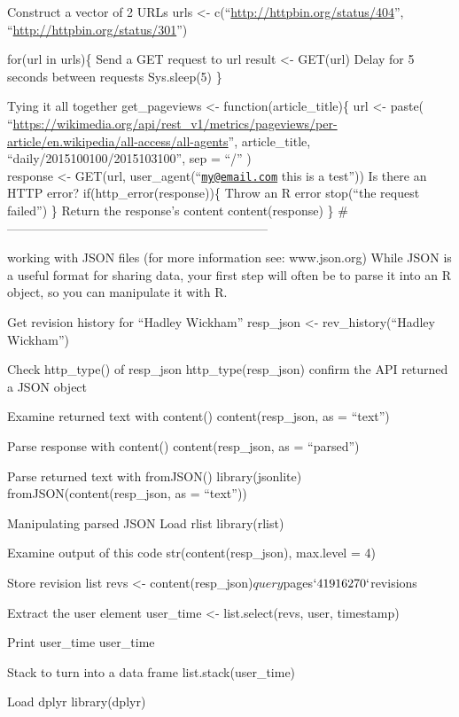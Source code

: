 \documentclass[]{book}
\begin{document}
Construct a vector of 2 URLs
urls \textless{}- c(``\url{http://httpbin.org/status/404}'',
``\url{http://httpbin.org/status/301}'')

for(url in urls)\{
Send a GET request to url
result \textless{}- GET(url)
Delay for 5 seconds between requests
Sys.sleep(5)
\}

Tying it all together
get\_pageviews \textless{}- function(article\_title)\{
url \textless{}- paste(
``\url{https://wikimedia.org/api/rest_v1/metrics/pageviews/per-article/en.wikipedia/all-access/all-agents}'',
article\_title,
``daily/2015100100/2015103100'',
sep = ``/''
)\\
response \textless{}- GET(url, user\_agent(``\href{mailto:my@email.com}{\nolinkurl{my@email.com}} this is a test''))
Is there an HTTP error?
if(http\_error(response))\{
Throw an R error
stop(``the request failed'')
\}
Return the response's content
content(response)
\}
\#---------------------------------------------------------------

working with JSON files (for more information see: www.json.org)
While JSON is a useful format for sharing data, your first step will often be to parse it into an R object, so you can manipulate it with R.

Get revision history for ``Hadley Wickham''
resp\_json \textless{}- rev\_history(``Hadley Wickham'')

Check http\_type() of resp\_json
http\_type(resp\_json) confirm the API returned a JSON object

Examine returned text with content()
content(resp\_json, as = ``text'')

Parse response with content()
content(resp\_json, as = ``parsed'')

Parse returned text with fromJSON()
library(jsonlite)
fromJSON(content(resp\_json, as = ``text''))

Manipulating parsed JSON
Load rlist
library(rlist)

Examine output of this code
str(content(resp\_json), max.level = 4)

Store revision list
revs \textless{}- content(resp\_json)\(query\)pages\(`41916270`\)revisions

Extract the user element
user\_time \textless{}- list.select(revs, user, timestamp)

Print user\_time
user\_time

Stack to turn into a data frame
list.stack(user\_time)

Load dplyr
library(dplyr)
\end{document}

